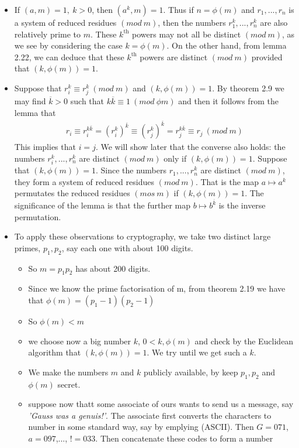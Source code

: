 \documentclass[a4paper]{article}
\begin{document}
\begin{itemize}
    \item If $(a,m)=1,\ k>0$, then $(a^k,m)=1$. Thus if $n=\phi(m)$ and $r_1,...,r_n$ is a system of reduced residues $(mod\ m)$, then the numbers $r_1^k,...,r_n^k$ are also relatively prime to $m$. These $k^\text{th}$ powers may not all be distinct $(mod\ m)$, as we see by considering the case $k=\phi(m)$. On the other hand, from lemma 2.22, we can deduce that these $k^\text{th}$ powers are distinct $(mod\ m)$ provided that $(k,\phi(m))=1$.
    \item Suppose that $r_i^k\equiv r_j^k\ (mod\ m)$ and $(k,\phi(m))=1$. By theorem 2.9 we may find $\overline{k}>0$ such that $k\overline{k}\equiv 1\ (mod\ \phi{m})$ and then it follows from the lemma that
    \begin{align}
        r_i\equiv r_i^{k\overline{k}}=(r_i^k)^{\overline{k}}\equiv (r_j^k)^{\overline{k}}= r_j^{k\overline{k}}\equiv r_j\ (mod\ m)
    \end{align}
    This implies that $i=j$. We will show later that the converse also holds: the numbers $r_i^k,...,r_n^k$ are distinct $(mod\ m)$ only if $(k,\phi(m))=1$. Suppose that $(k,\phi(m))=1$. Since the numbers $r_1,...,r_n^k$ are distinct $(mod\ m)$, they form a system of reduced residues $(mod\ m)$. That is the map $a\mapsto a^k$ permutates the reduced residues $(mos\ m)$ if $(k,\phi(m))=1$. The significance of the lemma is that the further map $b\mapsto b^{\overline{k}}$ is the inverse permutation.
    \item To apply these observations to cryptography, we take two distinct large primes, $p_1, p_2$, say each one with about 100 digits.
    \begin{itemize}
        \item So $m=p_1p_2$ has about 200 digits.
        \item Since we know the prime factorisation of m, from theorem 2.19 we have that $\phi(m)=(p_1-1)(p_2-1)$
        \item So $\phi(m)<m$
        \item we choose now a big number $k$, $0<k,\phi(m)$ and check by the Euclidean algorithm that $(k,\phi(m))=1$. We try until we get such a $k$.
        \item We make the numbers $m$ and $k$ publicly available, by keep $p_1,p_2$ and $\phi(m)$ secret.
        \item suppose now thatt some associate of ours wants to send us a message, say \textit{'Gauss was a genuis!'}. The associate first converts the characters to number in some standard way, say by emplying (ASCII). Then $G=071$, $a=097$,..., $!=033$. Then concatenate these codes to form a number

\end{itemize}
\end{itemize}
\end{document}
